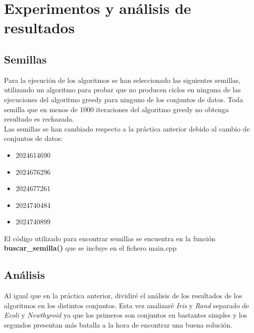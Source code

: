 \chapter{Experimentos y análisis de resultados}
\section{Semillas}
Para la ejecución de los algoritmos se han seleccionado las siguientes semillas, utilizando un algoritmo para probar que no producen ciclos en ninguna de las ejecuciones del algoritmo greedy para ninguno de los conjuntos de datos. Toda semilla que en menos de 1000 iteraciones del algoritmo greedy no obtenga resultado es rechazada. \\
Las semillas se han cambiado respecto a la práctica anterior debido al cambio de conjuntos de datos:
\begin{itemize}
   \item 2024614690
   \item 2024676296
   \item 2024677261
   \item 2024740484
   \item 2024740899
\end{itemize}


El código utilizado para encontrar semillas se encuentra en la función \textbf{buscar\_semilla()} que se incluye en el fichero main.cpp


\section{Análisis}
Al igual que en la práctica anterior, dividiré el análisis de los resultados de los algoritmos en los distintos conjuntos. Esta vez analizaré \emph{Iris} y \emph{Rand} separado de \emph{Ecoli} y \emph{Newthyroid} ya que los primeros son conjuntos en bastantes simples y los segundos presentan más batalla a la hora de encontrar una buena solución.

